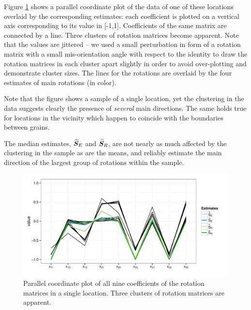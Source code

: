 Figure \ref{fig:pcp} shows a parallel coordinate plot of the data of one of these locations overlaid by the corresponding estimates: each coefficient is plotted on a vertical axis corresponding to its value in [-1,1]. Coefficients of the same matrix are connected by a line. Three clusters of rotation matrices become apparent. Note that the values are jittered -- we used a small perturbation in form of a rotation matrix with a small mis-orientation angle with respect to the identity to draw the rotation matrices in each cluster apart slightly in order to avoid over-plotting and demonstrate cluster sizes. The lines for the rotations are overlaid by the four estimates of main rotations (in color).

 Note that the figure shows a sample of a single location, yet the clustering in the data suggests clearly the presence of \emph{several} main directions. The same holds true for locations in the vicinity which happen to coincide with the boundaries between grains. 

The  median estimates, ${\widetilde{\bm S}_E}$  and ${\widetilde{\bm S}_R}$, are not nearly as much affected by the clustering in the sample as are the means, and reliably estimate the main direction of the largest group of rotations within the sample.


\begin{figure}[htbp] %
   \centering
   \includegraphics[width=.7\textwidth]{images/pcp.pdf} 
   \caption{ \label{fig:pcp}Parallel coordinate plot of all nine coefficients of the rotation matrices in a single location. Three clusters of rotation matrices are apparent.  }
\end{figure}



